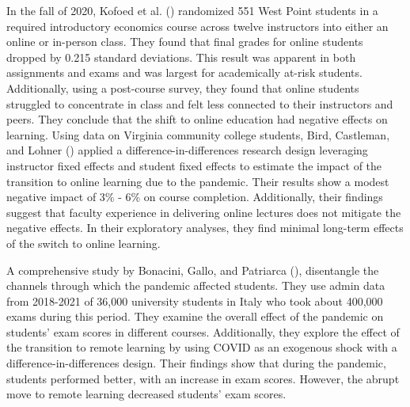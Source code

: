 \documentclass[
  12pt,
  letterpaper,
  DIV=11,
  numbers=noendperiod]{scrartcl}
\begin{document}
In the fall of 2020, Kofoed et al.
() randomized 551 West Point
students in a required introductory economics course across twelve
instructors into either an online or in-person class. They found that
final grades for online students dropped by 0.215 standard deviations.
This result was apparent in both assignments and exams and was largest
for academically at-risk students. Additionally, using a post-course
survey, they found that online students struggled to concentrate in
class and felt less connected to their instructors and peers. They
conclude that the shift to online education had negative effects on
learning. Using data on Virginia community college students, Bird,
Castleman, and Lohner () applied
a difference-in-differences research design leveraging instructor fixed
effects and student fixed effects to estimate the impact of the
transition to online learning due to the pandemic. Their results show a
modest negative impact of 3\% - 6\% on course completion. Additionally,
their findings suggest that faculty experience in delivering online
lectures does not mitigate the negative effects. In their exploratory
analyses, they find minimal long-term effects of the switch to online
learning.

A comprehensive study by Bonacini, Gallo, and Patriarca
(), disentangle the
channels through which the pandemic affected students. They use admin
data from 2018-2021 of 36,000 university students in Italy who took
about 400,000 exams during this period. They examine the overall effect
of the pandemic on students' exam scores in different courses.
Additionally, they explore the effect of the transition to remote
learning by using COVID as an exogenous shock with a
difference-in-differences design. Their findings show that during the
pandemic, students performed better, with an increase in exam scores.
However, the abrupt move to remote learning decreased students' exam
scores.
\end{document}
